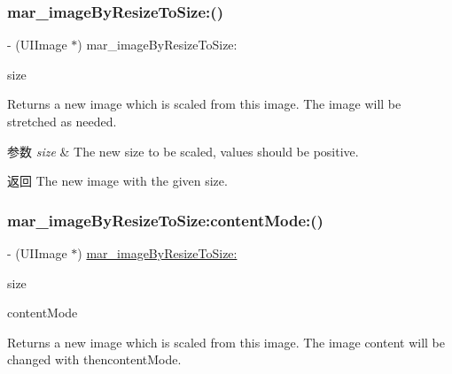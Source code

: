 \subsubsection{\texorpdfstring{mar\+\_\+image\+By\+Resize\+To\+Size\+:()}{mar\_imageByResizeToSize:()}}
{\footnotesize\ttfamily -\/ (U\+I\+Image $\ast$) mar\+\_\+image\+By\+Resize\+To\+Size\+: \begin{DoxyParamCaption}\item[{(C\+G\+Size)}]{size }\end{DoxyParamCaption}}

Returns a new image which is scaled from this image. The image will be stretched as needed.


\begin{DoxyParams}{参数}
{\em size} & The new size to be scaled, values should be positive.\\
\hline
\end{DoxyParams}
\begin{DoxyReturn}{返回}
The new image with the given size. 
\end{DoxyReturn}
\mbox{\label{category_u_i_image_07_m_a_r_e_x_08_a396de936fdc530ff44abf786ab45c60c}} 
\subsubsection{\texorpdfstring{mar\+\_\+image\+By\+Resize\+To\+Size\+:content\+Mode\+:()}{mar\_imageByResizeToSize:contentMode:()}}
{\footnotesize\ttfamily -\/ (U\+I\+Image $\ast$) \hyperlink{category_u_i_image_07_m_a_r_e_x_08_af12a9f699153eb6a42a876a72967db3b}{mar\+\_\+image\+By\+Resize\+To\+Size\+:} \begin{DoxyParamCaption}\item[{(C\+G\+Size)}]{size }\item[{contentMode:(U\+I\+View\+Content\+Mode)}]{content\+Mode }\end{DoxyParamCaption}}

Returns a new image which is scaled from this image. The image content will be changed with thencontent\+Mode.


